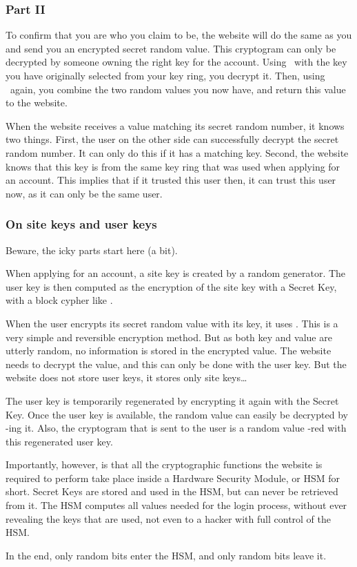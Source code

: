 \subsubsection{Part II}
To confirm that you are who you claim to be,
the website will do the same as you and send you an encrypted secret random value.
This cryptogram can only be decrypted by someone owning the right key for the account.
Using \XOR\ with the key you have originally selected from your key ring,
you decrypt it.
Then,
using \XOR\ again,
you combine the two random values you now have,
and return this value to the website.
\par
When the website receives a value matching its secret random number, it knows two things.
First, the user on the other side can successfully decrypt the secret random number.
It can only do this if it has a matching key.
Second, the website knows that this key is from the same key ring that was used when applying for an account.
This implies that if it trusted this user then, it can trust this user now, as it can only be the same user.

\subsubsection{On site keys and user keys}
Beware, the icky parts start here (a bit).
\par
When applying for an account, a site key is created by a random generator.
The user key is then computed as the encryption of the site key with a Secret Key, with a block cypher like \AES.
\par
When the user encrypts its secret random value with its key,
it uses \XOR.
This is a very simple and reversible encryption method.
But as both key and value are utterly random, no information is stored in the encrypted value.
The website needs to decrypt the value, and this can only be done with the user key.
But the website does not store user keys,
it stores only site keys\ldots
\par
The user key is temporarily regenerated by encrypting it again with the Secret Key.
Once the user key is available, the random value can easily be decrypted by \XOR-ing it.
Also, the cryptogram that is sent to the user is a random value \XOR-red with this regenerated user key.
\par
Importantly,
however,
is that all the cryptographic functions the website is required to perform take place inside a Hardware Security Module,
or HSM for short.
Secret Keys are stored and used in the HSM,
but can never be retrieved from it.
The HSM computes all values needed for the login process,
without ever revealing the keys that are used,
not even to a hacker with full control of the HSM.
\par
In the end,
only random bits enter the HSM,
and only random bits leave it.

